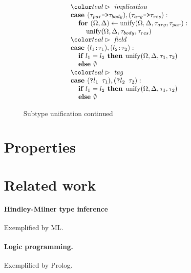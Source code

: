 \documentclass[acmsmall]{acmart}
\begin{document}
\begin{figure*}[h]
\[\begin{array}[t]{@{} l}
    \\

    \I \C{implication}
    \\
    \I \B{case } (\code{$\tau_{par}$->$\tau_{body}$}), (\code{$\tau_{arg}$->$\tau_{res}$}) : 
    \\
    \I\I \B{for } (\Omega, \Delta) \leftarrow \F{unify}(\Omega, \Delta, \tau_{arg}, \tau_{par}):
    \\
    \I\I\I \F{unify}(\Omega, \Delta, \tau_{body}, \tau_{res})

    \\

    \I \C{field}
    \\
    \I \B{case } (\code{$l_1$:$\tau_1$}), (\code{$l_2$:$\tau_2$}) :
    \\
    \I\I \B{if } l_1 = l_2 \B{ then } \F{unify}(\Omega, \Delta, \tau_1, \tau_2)
    \\
    \I\I \B{else } \emptyset 

    \\

    \I \C{tag}
    \\
    \I \B{case } (\code{?$l_1$ $\tau_1$}), (\code{?$l_2$ $\tau_2$}) :
    \\
    \I\I \B{if } l_1 = l_2 \B{ then } \F{unify}(\Omega, \Delta, \tau_1, \tau_2)
    \\
    \I\I \B{else } \emptyset 
\end{array}
\]

\caption{Subtype unification continued}
\end{figure*}


\section{Properties}

\section{Related work}

\paragraph{Hindley-Milner type inference}
Exemplified by ML.

\paragraph{Logic programming.}
Exemplified by Prolog. 
\end{document}
